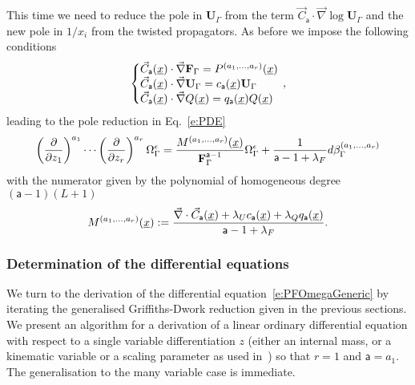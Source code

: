 \documentclass[a4paper,12pt]{article}
\numberwithin{equation}{section}
\numberwithin{figure}{section}
\begin{document}
%
This time we need to reduce the pole in $\mathbf{U}_\Gamma$ from  the term $\vec
    C_{\mathsf{a}}\cdot\vec\nabla\log\mathbf{U}_\Gamma$ and the new
    pole in $1/x_i$ from the twisted propagators.
    As before we  impose the following conditions
\begin{equation}\label{e:sysCFUAnReg}
   \left\{\begin{array}{@{}l@{}}
\vec C_{\mathsf{a}} (\underline x) \cdot \vec \nabla \textbf{F}_\Gamma
            =    P^{(a_1,\dots,a_r)}(\underline x)\\
\vec C_{\mathsf{a}} (\underline x)\cdot\vec \nabla\textbf{U}_\Gamma=
            c_{{\mathsf{a}}}(\underline x) \textbf{U}_\Gamma \\
            \vec C_{\mathsf{a}} (\underline x)\cdot\vec \nabla
            Q(\underline x)=
            q_{{\mathsf{a}}}(\underline x) Q(\underline x)
  \end{array}\right.\,,
\end{equation}
leading to the pole  reduction in Eq.~\eqref{e:PDE} 
% 
\begin{equation}\label{e:RedFinalAnReg}
\left(\partial\over \partial z_1\right)^{a_1}\cdots\left(\partial
  \over\partial z_r\right)^{a_r} \Omega_\Gamma^\epsilon={
M^{(a_1,\dots,a_r)}
     (\underline x)
\over \textbf{F}_\Gamma^{\mathsf{a}-1}}\Omega_\Gamma^\epsilon
+{  1\over \mathsf{a}-1+\lambda_F} d\beta_\Gamma^{(a_1,\dots,a_r)}
\end{equation}
with the numerator given by the polynomial of homogeneous degree $(\mathsf{a}-1)(L+1)$
\begin{equation}
  \label{e:MfinalAnReg}
  M^{(a_1,\dots,a_r)}(\underline x):={
\vec\nabla \cdot \vec C_{\mathsf{a}}
     (\underline x)
+  \lambda_U
    c_{\mathsf{a}}(\underline x)+\lambda_Q q_{\mathsf{a}}(\underline x)\over
    \mathsf{a}-1+\lambda_F}.
\end{equation}
%


\subsubsection{Determination of the differential equations}
\label{sec:deriv-diff-equat}


We turn to the derivation of the differential
equation~\eqref{e:PFOmegaGeneric}  by iterating the generalised
Griffiths-Dwork reduction given in the previous sections. We present an algorithm for a derivation of
a linear ordinary differential equation with respect to a single
variable differentiation $z$ (either an internal mass, or a kinematic
variable or a scaling parameter as used
in~\cite{Lairez:2022zkj,Doran:2023yzu}) so that $r=1$ and
$\mathsf{a}=a_1$. The generalisation to the many variable  case is immediate.
\end{document}
